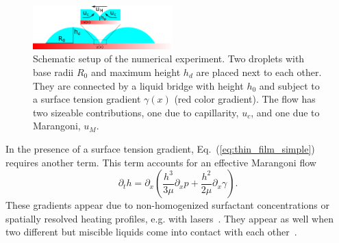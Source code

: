 \documentclass[twocolumn,amsmath,amssymb,showpacs,pre,nofootinbib,superscriptaddress]{revtex4-1} %
\begin{document}
\begin{figure}
    \centering
    \includegraphics[width=0.48\textwidth]{Figures/setup.png}
    \caption{Schematic setup of the numerical experiment. 
    Two droplets with base radii $R_0$ and maximum height $h_d$ are placed next to each other. 
    They are connected by a liquid bridge with height $h_0$ and subject to a surface tension gradient $\gamma(x)$ (red color gradient).
    The flow has two sizeable contributions, one due to capillarity, $u_c$, and one due to Marangoni, $u_M$.
    }
    \label{fig:schematics}
\end{figure}
In the presence of a surface tension gradient, Eq.~(\ref{eq:thin_film_simple}) requires another term.
This term accounts for an effective Marangoni flow~\cite{doi:10.1021/la500459v, karpitschka2014sharp, bestehorn20033d, doi:10.1021/la960488a}
\begin{equation}\label{eq:thin_with_marangoni}
    \partial_t h = \partial_x \left(\frac{h^3}{3\mu}\partial_x p + \frac{h^2}{2\mu}\partial_x\gamma\right).
\end{equation}
These gradients appear due to non-homogenized surfactant concentrations or spatially resolved heating profiles, e.g. with lasers~\cite{doi:10.1021/la960488a, NIKOLOV2002325, bruning2018delayed, wedershoven2014infrared}. 
They appear as well when two different but miscible liquids come into contact with each other~\cite{doi:10.1021/la800630w, karpitschka2014sharp, doi:10.1021/la500459v}. 
\end{document}
